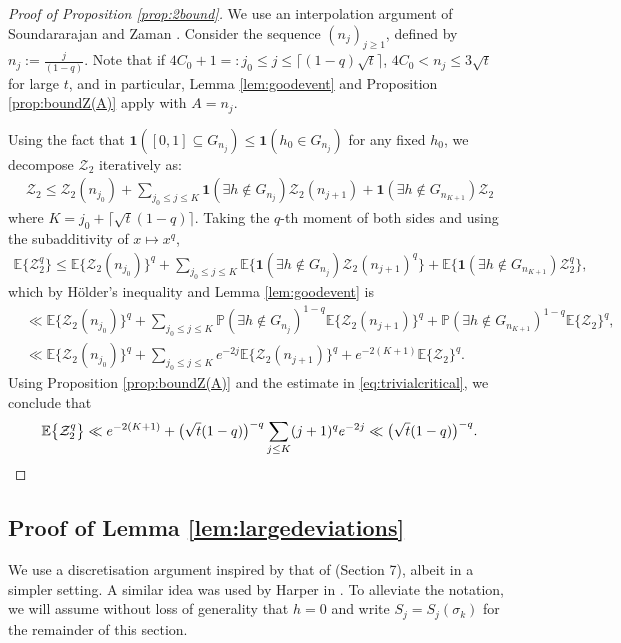 \documentclass{amsart}
\theoremstyle{definition}
\theoremstyle{remark}
\numberwithin{equation}{section}
\begin{document}
 \begin{proof}[Proof of Proposition \ref{prop:2bound}]
     We use an interpolation argument of Soundararajan and Zaman \cite{SoundZaman}. Consider the sequence $(n_j)_{j\geq 1}$, defined by $n_j:= \frac{j}{(1-q)}$. Note that if $4C_0+1=:j_0\leq j\leq \lceil(1-q)\sqrt{t}\rceil$, $4C_0<n_j\leq 3 \sqrt{t}$ for large $t$, and in particular, Lemma \ref{lem:goodevent} and Proposition \ref{prop:boundZ(A)} apply with $A=n_j$.

Using the fact that $\mathbf{1}([0,1]\subseteq  G_{n_j})\leq \mathbf{1}(h_0\in G_{n_j})$ for any fixed $h_0$, we decompose $\mathcal{Z}_2$ iteratively as:
\begin{align}\label{eq:decomposition}
    \mathcal{Z}_2\leq \mathcal{Z}_2(n_{j_0})+\sum_{j_0\leq j\leq K} \mathbf{1}(\exists h\notin G_{n_j})\mathcal{Z}_2(n_{j+1})+\mathbf{1}(\exists h\notin G_{n_{K+1}})\mathcal{Z}_2
\end{align}
where $K=j_0+\lceil \sqrt{t}(1-q)\rceil$.
Taking the $q$-th moment of both sides and using the subadditivity of $x\mapsto x^q$, 
\begin{align*}
    \mathbb{E}\big\{\mathcal{Z}_2^q\big\} \leq \mathbb{E}\big\{\mathcal{Z}_2(n_{j_0})\big\}^q+ \sum_{j_0\leq j\leq K}\mathbb{E}\big\{\mathbf{1}(\exists h\notin G_{n_j})\mathcal{Z}_2(n_{j+1})^q\big\}+\mathbb{E}\big\{\mathbf{1}(\exists h\notin G_{n_{K+1}})\mathcal{Z}_2^q\big\},
\end{align*}
which by Hölder's inequality and Lemma \ref{lem:goodevent} is
\begin{align*}
&\ll\mathbb{E}\big\{\mathcal{Z}_2(n_{j_0})\big\}^q+ \sum_{j_0\leq j\leq K}\mathbb{P}(\exists h\notin G_{n_j})^{1-q}\mathbb{E}\big\{\mathcal{Z}_2(n_{j+1})\big\}^q+\mathbb{P}(\exists h\notin G_{n_{K+1}})^{1-q}\mathbb{E}\big\{\mathcal{Z}_2\big\}^q,\\
&\ll \mathbb{E}\big\{\mathcal{Z}_2(n_{j_0})\big\}^q+ \sum_{j_0\leq j\leq K} e^{-2j}\mathbb{E}\big\{\mathcal{Z}_2(n_{j+1})\big\}^q+e^{-2(K+1)}\mathbb{E}\big\{\mathcal{Z}_2\big\}^q.
\end{align*}
Using Proposition \ref{prop:boundZ(A)} and the estimate in \eqref{eq:trivialcritical}, we conclude that
\[
     \mathbb{E}\big\{\mathcal{Z}_2^q\big\} \ll e^{-2(K+1)}+\big(\sqrt{t}(1-q)\big)^{-q} \sum_{j\leq K} (j+1)^qe^{-2j} \ll \big(\sqrt{t}(1-q)\big)^{-q}.\qedhere
\]
 \end{proof}
\subsection{Proof of Lemma \ref{lem:largedeviations}}\label{sec:largedeviations} We use a discretisation argument inspired by that of \cite{FHK1} (Section 7), albeit in a simpler setting. A similar idea was used by Harper in \cite{HarperRMF}. To alleviate the notation, we will assume without loss of generality that $h=0$ and write $S_j=S_j(\sigma_k)$ for the remainder of this section.
\end{document}
